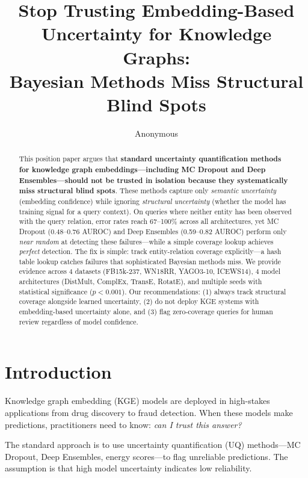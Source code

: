 \documentclass{article}
\title{Stop Trusting Embedding-Based Uncertainty for Knowledge Graphs: \\
Bayesian Methods Miss Structural Blind Spots}
\author{
  Anonymous
}
\begin{document}
\maketitle

\begin{abstract}
This position paper argues that \textbf{standard uncertainty quantification methods for knowledge graph embeddings---including MC Dropout and Deep Ensembles---should not be trusted in isolation because they systematically miss structural blind spots}. These methods capture only \emph{semantic uncertainty} (embedding confidence) while ignoring \emph{structural uncertainty} (whether the model has training signal for a query context). On queries where neither entity has been observed with the query relation, error rates reach 67--100\% across all architectures, yet MC Dropout (0.48--0.76 AUROC) and Deep Ensembles (0.59--0.82 AUROC) perform only \emph{near random} at detecting these failures---while a simple coverage lookup achieves \emph{perfect} detection. The fix is simple: track entity-relation coverage explicitly---a hash table lookup catches failures that sophisticated Bayesian methods miss. We provide evidence across 4 datasets (FB15k-237, WN18RR, YAGO3-10, ICEWS14), 4 model architectures (DistMult, ComplEx, TransE, RotatE), and multiple seeds with statistical significance ($p<0.001$). Our recommendations: (1) always track structural coverage alongside learned uncertainty, (2) do not deploy KGE systems with embedding-based uncertainty alone, and (3) flag zero-coverage queries for human review regardless of model confidence.
\end{abstract}

\section{Introduction}

Knowledge graph embedding (KGE) models are deployed in high-stakes applications from drug discovery to fraud detection. When these models make predictions, practitioners need to know: \emph{can I trust this answer?}

The standard approach is to use uncertainty quantification (UQ) methods---MC Dropout, Deep Ensembles, energy scores---to flag unreliable predictions. The assumption is that high model uncertainty indicates low reliability.
\end{document}
